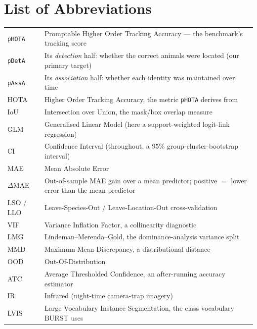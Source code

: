 \documentclass{mproj}
\begin{document}
\chapter*{List of Abbreviations}
\begin{tabular}{@{}p{2.7cm}p{11.2cm}@{}}
\texttt{pHOTA}   & Promptable Higher Order Tracking Accuracy --- the benchmark's tracking score \\
\texttt{pDetA}   & Its \emph{detection} half: whether the correct animals were located (our primary target) \\
\texttt{pAssA}   & Its \emph{association} half: whether each identity was maintained over time \\
HOTA             & Higher Order Tracking Accuracy, the metric \texttt{pHOTA} derives from \\
IoU              & Intersection over Union, the mask/box overlap measure \\
\addlinespace
GLM              & Generalised Linear Model (here a support-weighted logit-link regression) \\
CI               & Confidence Interval (throughout, a $95\%$ group-cluster-bootstrap interval) \\
MAE              & Mean Absolute Error \\
$\Delta$MAE      & Out-of-sample MAE gain over a mean predictor; positive $=$ lower error than the mean predictor \\
LSO / LLO        & Leave-Species-Out / Leave-Location-Out cross-validation \\
VIF              & Variance Inflation Factor, a collinearity diagnostic \\
LMG              & Lindeman--Merenda--Gold, the dominance-analysis variance split \\
MMD              & Maximum Mean Discrepancy, a distributional distance \\
\addlinespace
OOD              & Out-Of-Distribution \\
ATC              & Average Thresholded Confidence, an after-running accuracy estimator \\
IR               & Infrared (night-time camera-trap imagery) \\
LVIS             & Large Vocabulary Instance Segmentation, the class vocabulary BURST uses \\
\end{tabular}








\appendix




\end{document}
